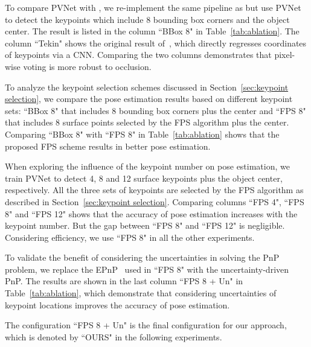 \documentclass[10pt,twocolumn,letterpaper]{article}
\begin{document}
To compare PVNet with \cite{tekin2018real}, we re-implement the same pipeline as \cite{tekin2018real} but use PVNet to detect the keypoints which include 8 bounding box corners and the object center. The result is listed in the column ``BBox 8" in Table~\ref{tab:ablation}. The column ``Tekin" shows the original result of~\cite{tekin2018real}, which directly regresses coordinates of keypoints via a CNN. Comparing the two columns demonstrates that pixel-wise voting is more robust to occlusion.

To analyze the keypoint selection schemes discussed in Section~\ref{sec:keypoint selection}, we compare the pose estimation results based on different keypoint sets: ``BBox 8" that includes 8 bounding box corners plus the center and  ``FPS 8" that includes 8 surface points selected by the FPS algorithm plus the center. Comparing ``BBox 8" with ``FPS 8" in Table~\ref{tab:ablation} shows that the proposed FPS scheme results in better pose estimation.

When exploring the influence of the keypoint number on pose estimation, we train PVNet to detect 4, 8 and 12 surface keypoints plus the object center, respectively. All the three sets of keypoints are selected by the FPS algorithm as described in Section~\ref{sec:keypoint selection}. Comparing columns ``FPS 4", ``FPS 8" and ``FPS 12" shows that the accuracy of pose estimation increases with the keypoint number. But the gap between ``FPS 8" and ``FPS 12" is negligible. Considering efficiency, we use ``FPS 8" in all the other experiments. 

To validate the benefit of considering the uncertainties in solving the PnP problem, we replace the EPnP~\cite{lepetit2009epnp} used in ``FPS 8" with the uncertainty-driven PnP. The results are shown in the last column ``FPS 8 + Un" in Table~\ref{tab:ablation}, which demonstrate that considering uncertainties of keypoint locations improves the accuracy of pose estimation.

The configuration ``FPS 8 + Un" is the final configuration for our approach, which is denoted by ``OURS" in the following experiments.
\end{document}
